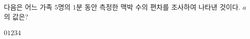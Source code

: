 다음은 어느 가족 $5$명의 $1$분 동안 측정한 맥박 수의 편차를 조사하여 나타낸 것이다. $a$의 값은?
\begin{choices32}{$0$}{$1$}{$2$}{$3$}{$4$}\end{choices32}
